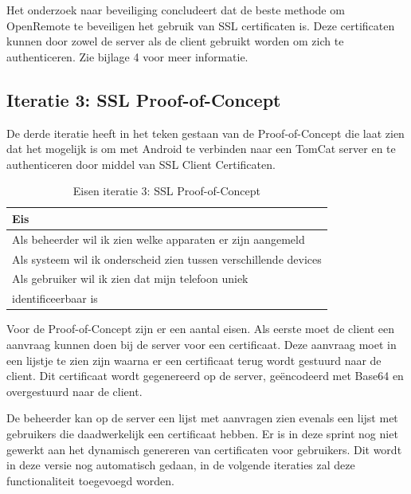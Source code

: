 \documentclass[]{article}
\begin{document}
Het onderzoek naar beveiliging concludeert dat de beste methode om
OpenRemote te beveiligen het gebruik van SSL certificaten is. Deze
certificaten kunnen door zowel de server als de client gebruikt worden om
zich te authenticeren. Zie bijlage 4 voor meer informatie.

\subsection{Iteratie 3: SSL Proof-of-Concept}
De derde iteratie heeft in het teken gestaan van de Proof-of-Concept die laat zien
dat het mogelijk is om met Android te verbinden naar een TomCat server en
te authenticeren door middel van SSL Client Certificaten.

\begin{table}[htpb]
  \caption{Eisen iteratie 3: SSL Proof-of-Concept}
  \begin{center}
    \begin{tabular}{|| l ||}\hline
        Eis                                                              \\\hline\hline
        Als beheerder wil ik zien welke apparaten er zijn aangemeld      \\\hline
        Als systeem wil ik onderscheid zien tussen verschillende devices \\\hline
        Als gebruiker wil ik zien dat mijn telefoon uniek                \\ 
        identificeerbaar is                                              \\\hline
    \end{tabular}                                                         
  \end{center}                                                            
\end{table}                                                               

Voor de Proof-of-Concept zijn er een aantal eisen. Als eerste moet de client
een aanvraag kunnen doen bij de server voor een certificaat. Deze aanvraag
moet in een lijstje te zien zijn waarna er een certificaat terug wordt
gestuurd naar de client. Dit certificaat wordt gegenereerd op de server,
ge\"encodeerd met Base64 en overgestuurd naar de client.

De beheerder kan op de server een lijst met aanvragen zien evenals een
lijst met gebruikers die daadwerkelijk een certificaat hebben. Er is in deze
sprint nog niet gewerkt aan het dynamisch genereren van certificaten voor
gebruikers. Dit wordt in deze versie nog automatisch gedaan, in de volgende
iteraties zal deze functionaliteit toegevoegd worden.
\end{document}
